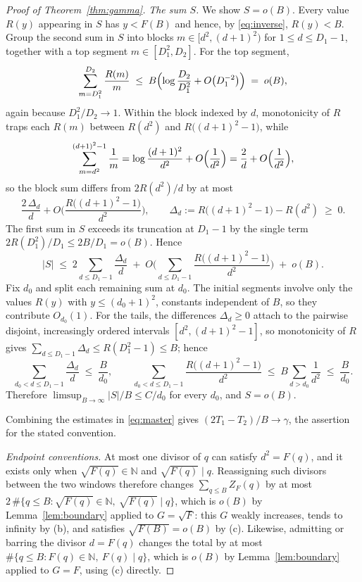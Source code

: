 \documentclass[11pt]{amsart}
\theoremstyle{remark}
\newcommand{\N}{\mathbb{N}}
\newcommand{\eul}{\gamma}
\begin{document}
\begin{proof}[Proof of Theorem~\ref{thm:gamma}]
\smallskip
\emph{The sum $S$.}
We show $S=o(B)$.  Every value $R(y)$ appearing in $S$ has $y<F(B)$
and hence, by \eqref{eq:inverse}, $R(y)<B$.  Group the second sum in
$S$ into blocks $m\in[d^{2},(d+1)^{2})$ for $1\le d\le D_{1}-1$,
together with a top segment $m\in[D_{1}^{2},D_{2}]$.  For the top
segment,
\[
\sum_{m=D_{1}^{2}}^{D_{2}}\frac{R(m)}{m}
\;\le\;B\Bigl(\log\frac{D_{2}}{D_{1}^{2}}+O\bigl(D_{1}^{-2}\bigr)\Bigr)
\;=\;o(B),
\]
again because $D_{1}^{2}/D_{2}\to1$.  Within the block indexed by $d$,
monotonicity of $R$ traps each $R(m)$ between $R(d^{2})$ and
$R\bigl((d+1)^{2}-1\bigr)$, while
\[
\sum_{m=d^{2}}^{(d+1)^{2}-1}\frac1m
=\log\frac{(d+1)^{2}}{d^{2}}+O\Bigl(\frac1{d^{2}}\Bigr)
=\frac{2}{d}+O\Bigl(\frac1{d^{2}}\Bigr),
\]
so the block sum differs from $2R(d^{2})/d$ by at most
\[
\frac{2\,\Delta_{d}}{d}
+O\biggl(\frac{R\bigl((d+1)^{2}-1\bigr)}{d^{2}}\biggr),
\qquad
\Delta_{d}:=R\bigl((d+1)^{2}-1\bigr)-R(d^{2})\;\ge\;0 .
\]
The first sum in $S$ exceeds its truncation at $D_{1}-1$ by the single
term $2R(D_{1}^{2})/D_{1}\le 2B/D_{1}=o(B)$.  Hence
\[
|S|\;\le\;
2\sum_{d\le D_{1}-1}\frac{\Delta_{d}}{d}
\;+\;O\biggl(\sum_{d\le D_{1}-1}
\frac{R\bigl((d+1)^{2}-1\bigr)}{d^{2}}\biggr)
\;+\;o(B).
\]
Fix $d_{0}$ and split each remaining sum at $d_{0}$.  The initial
segments involve only the values $R(y)$ with $y\le(d_{0}+1)^{2}$,
constants independent of $B$, so they contribute $O_{d_{0}}(1)$.  For
the tails, the differences $\Delta_{d}\ge0$ attach to the pairwise
disjoint, increasingly ordered intervals $[d^{2},(d+1)^{2}-1]$, so
monotonicity of $R$ gives
$\sum_{d\le D_{1}-1}\Delta_{d}\le R(D_{1}^{2}-1)\le B$; hence
\[
\sum_{d_{0}<d\le D_{1}-1}\frac{\Delta_{d}}{d}
\;\le\;\frac{B}{d_{0}},
\qquad
\sum_{d_{0}<d\le D_{1}-1}
\frac{R\bigl((d+1)^{2}-1\bigr)}{d^{2}}
\;\le\;B\sum_{d>d_{0}}\frac1{d^{2}}
\;\le\;\frac{B}{d_{0}} .
\]
Therefore $\limsup_{B\to\infty}|S|/B\le C/d_{0}$ for every $d_{0}$, and
$S=o(B)$.

Combining the estimates in \eqref{eq:master} gives
$(2T_{1}-T_{2})/B\to\eul$, the assertion for the stated convention.

\smallskip
\emph{Endpoint conventions.}
At most one divisor of $q$ can satisfy $d^{2}=F(q)$, and it exists only
when $\sqrt{F(q)}\in\N$ and $\sqrt{F(q)}\mid q$.  Reassigning such
divisors between the two windows therefore changes
$\sum_{q\le B}Z_{F}(q)$ by at most
$2\,\#\{q\le B:\sqrt{F(q)}\in\N,\ \sqrt{F(q)}\mid q\}$, which is $o(B)$
by Lemma~\ref{lem:boundary} applied to $G=\sqrt F$: this $G$ weakly
increases, tends to infinity by (b), and satisfies
$\sqrt{F(B)}=o(B)$ by (c).  Likewise, admitting or barring the divisor
$d=F(q)$ changes the total by at most
$\#\{q\le B:F(q)\in\N,\ F(q)\mid q\}$, which is $o(B)$ by
Lemma~\ref{lem:boundary} applied to $G=F$, using (c) directly.
\end{proof}
\end{document}

